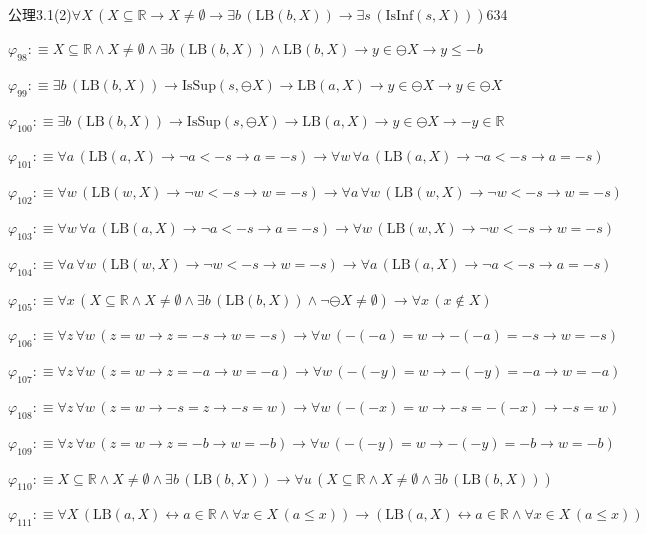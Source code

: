 \begin{fullproof}{公理3.1(2)}{$\forall X\,(X \subseteq \mathbb{R} \to X \neq \emptyset \to \exists b\,(\mathrm{LB}(b,X)) \to \exists s\,(\mathrm{IsInf}(s,X)))$}{634}
\begin{abbrevlist}
\item $\varphi_{98} :\equiv X \subseteq \mathbb{R} \land X \neq \emptyset \land \exists b\,(\mathrm{LB}(b,X)) \land \mathrm{LB}(b,X) \to y \in \ominus X \to y \leq -b$
\item $\varphi_{99} :\equiv \exists b\,(\mathrm{LB}(b,X)) \to \mathrm{IsSup}(s,\ominus X) \to \mathrm{LB}(a,X) \to y \in \ominus X \to y \in \ominus X$
\item $\varphi_{100} :\equiv \exists b\,(\mathrm{LB}(b,X)) \to \mathrm{IsSup}(s,\ominus X) \to \mathrm{LB}(a,X) \to y \in \ominus X \to -y \in \mathbb{R}$
\item $\varphi_{101} :\equiv \forall a\,(\mathrm{LB}(a,X) \to \neg a < -s \to a = -s) \to \forall w\,\forall a\,(\mathrm{LB}(a,X) \to \neg a < -s \to a = -s)$
\item $\varphi_{102} :\equiv \forall w\,(\mathrm{LB}(w,X) \to \neg w < -s \to w = -s) \to \forall a\,\forall w\,(\mathrm{LB}(w,X) \to \neg w < -s \to w = -s)$
\item $\varphi_{103} :\equiv \forall w\,\forall a\,(\mathrm{LB}(a,X) \to \neg a < -s \to a = -s) \to \forall w\,(\mathrm{LB}(w,X) \to \neg w < -s \to w = -s)$
\item $\varphi_{104} :\equiv \forall a\,\forall w\,(\mathrm{LB}(w,X) \to \neg w < -s \to w = -s) \to \forall a\,(\mathrm{LB}(a,X) \to \neg a < -s \to a = -s)$
\item $\varphi_{105} :\equiv \forall x\,(X \subseteq \mathbb{R} \land X \neq \emptyset \land \exists b\,(\mathrm{LB}(b,X)) \land \neg \ominus X \neq \emptyset) \to \forall x\,(x \notin X)$
\item $\varphi_{106} :\equiv \forall z\,\forall w\,(z = w \to z = -s \to w = -s) \to \forall w\,(-(-a) = w \to -(-a) = -s \to w = -s)$
\item $\varphi_{107} :\equiv \forall z\,\forall w\,(z = w \to z = -a \to w = -a) \to \forall w\,(-(-y) = w \to -(-y) = -a \to w = -a)$
\item $\varphi_{108} :\equiv \forall z\,\forall w\,(z = w \to -s = z \to -s = w) \to \forall w\,(-(-x) = w \to -s = -(-x) \to -s = w)$
\item $\varphi_{109} :\equiv \forall z\,\forall w\,(z = w \to z = -b \to w = -b) \to \forall w\,(-(-y) = w \to -(-y) = -b \to w = -b)$
\item $\varphi_{110} :\equiv X \subseteq \mathbb{R} \land X \neq \emptyset \land \exists b\,(\mathrm{LB}(b,X)) \to \forall u\,(X \subseteq \mathbb{R} \land X \neq \emptyset \land \exists b\,(\mathrm{LB}(b,X)))$
\item $\varphi_{111} :\equiv \forall X\,(\mathrm{LB}(a,X) \leftrightarrow a \in \mathbb{R} \land \forall x \in X\,(a \leq x)) \to (\mathrm{LB}(a,X) \leftrightarrow a \in \mathbb{R} \land \forall x \in X\,(a \leq x))$

\end{abbrevlist}
\end{fullproof}
